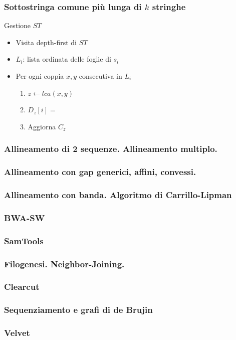 \begin{frame}[fragile]
\frametitle{Sottostringa comune più lunga di $k$ stringhe}
\begin{block}{Gestione $ST$}
\begin{itemize}
\item
Visita depth-first di $ST$
\item
$L_{i}$: lista ordinata delle foglie di $s_{i}$
\item
Per ogni coppia $x,y$ consecutiva in $L_{i}$
\begin{enumerate}
\item
$z\gets lca(x,y)$
\item
$D_{z}[i]=$
\item
Aggiorna $C_{z}$
\end{enumerate}
\end{itemize}
\end{block}
\end{frame}

\begin{frame}[fragile]
\frametitle{Allineamento di 2 sequenze. Allineamento multiplo.}
\end{frame}

\begin{frame}[fragile]
\frametitle{Allineamento con gap generici, affini, convessi.}
\end{frame}

\begin{frame}[fragile]
\frametitle{Allineamento con banda. Algoritmo di Carrillo-Lipman}
\end{frame}

\begin{frame}[fragile]
\frametitle{BWA-SW}
\end{frame}

\begin{frame}[fragile]
\frametitle{SamTools}
\end{frame}

\begin{frame}[fragile]
\frametitle{Filogenesi. Neighbor-Joining.}
\end{frame}

\begin{frame}[fragile]
\frametitle{Clearcut}
\end{frame}

\begin{frame}[fragile]
\frametitle{Sequenziamento e grafi di de Brujin}
\end{frame}

\begin{frame}[fragile]
\frametitle{Velvet}
\end{frame}




